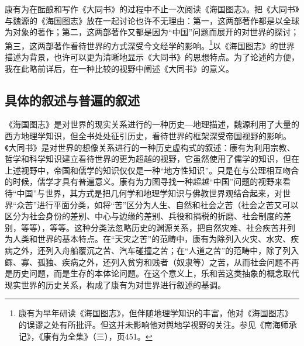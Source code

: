 \documentclass[a4paper, 12pt, openright]{ctexbook}
\begin{document}
康有为在酝酿和写作《大同书》的过程中不止一次阅读《海国图志》。把《大同书》与魏源的《海国图志》放在一起讨论也许不无理由：第一，这两部著作都是以全球为对象的著作；第二，这两部著作又都是因为“中国”问题而展开的对世界的探讨；第三，这两部著作看待世界的方式深受今文经学的影响。\footnote{康有为早年研读《海国图志》，但伴随地理学知识的丰富，他对《海国图志》的误谬之处有所批评。但这并未影响他对舆地学视野的关注。参见《南海师承记》，《康有为全集》（三），页451。}以《海国图志》的世界描述为背景，也许可以更为清晰地显示《大同书》的思想特点。为了论述的方便，我在此略前详后，在一种比较的视野中阐述《大同书》的意义。

\subsection{具体的叙述与普遍的叙述}

《海国图志》是对世界的现实关系进行的一种历史—地理描述，魏源利用了大量的西方地理学知识，但全书处处征引历史，看待世界的框架深受帝国视野的影响。《大同书》是对世界的想像关系进行的一种历史虚构式的叙述：康有为利用宗教、哲学和科学知识建立看待世界的更为超越的视野，它虽然使用了儒学的知识，但在上述视野中，帝国和儒学的知识仅仅是一种“地方性知识”。只是在与公理相互吻合的时候，儒学才具有普遍意义。康有为力图寻找一种超越“中国”问题的视野来看待“中国”与世界，其方式是把几何学和地理学知识与佛教世界观结合起来，对世界“众苦”进行平面分类，如将“苦”区分为人生、自然和社会之苦（社会之苦又可以区分为社会身份的差别、中心与边缘的差别、兵役和捐税的折磨、社会制度的差别，等等），等等。这种分类法忽略历史的渊源关系，把自然灾难、社会疾苦并列为人类和世界的基本特点。在“天灾之苦”的范畴中，康有为除列入火灾、水灾、疾病之外，还列入舟船覆沉之苦、汽车碰撞之苦；在“人道之苦”的范畴中，除了列入鳏、寡、孤独、疾病之外，还列入贫穷和贱者（奴隶等）之苦，从而社会问题不再是历史问题，而是生存的本体论问题。在这个意义上，乐和苦这类抽象的概念取代现实世界的历史关系，构成了康有为对世界进行叙述的基调。
\end{document}
